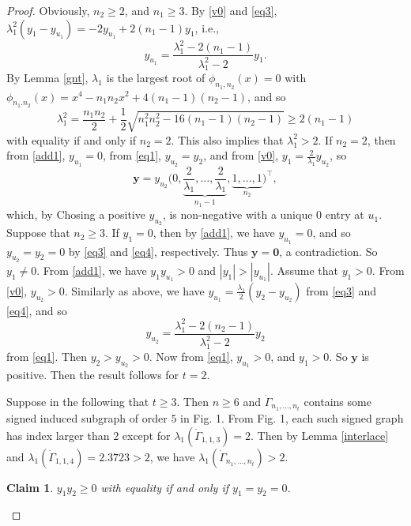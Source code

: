 \documentclass[10pt,a4paper]{amsart}
\numberwithin{equation}{section}
\newtheorem {Claim} {Claim}[section]
\begin{document}
\begin{proof}
Obviously, $n_2\ge 2$, and $n_1\ge 3$.  By \eqref{v0} and \eqref{eq3},  $\lambda_1^2(y_1-y_{u_1})=-2y_{u_1}+2(n_1-1)y_1$, i.e., 
\begin{equation}\label{add1}
y_{u_1}=\frac{\lambda_1^2-2(n_1-1)}{\lambda_1^2-2}y_1. 
\end{equation}
By Lemma \ref{gnt}, $\lambda_1$ is the largest root of $\phi_{n_1,n_2}(x)=0$ with $\phi_{n_1.n_2}(x)=x^4-n_1n_2x^2+4(n_1-1)(n_2-1)$, and so
\[
\lambda_1^2=\frac{n_1n_2}{2}+\frac{1}{2}\sqrt{n_1^2n_2^2-16(n_1-1)(n_2-1)}\ge 2(n_1-1)
\]
with equality if and only if $n_2=2$. This also implies that $\lambda_1^2>2$.  
If $n_2=2$, then from \eqref{add1}, 
 $y_{u_1}=0$,  from \eqref{eq1}, $y_{u_2}=y_2$, and from \eqref{v0},
 $y_1=\frac{2}{\lambda_1}y_{u_2}$, so 
 \[
\mathbf{y}=y_{u_2}\bigg(0,\underbrace{\frac{2}{\lambda_1},\dots,\frac{2}{\lambda_1}}_{n_1-1},\underbrace{1,\dots,1}_{n_2}\bigg)^\top,\]
which, by Chosing a positive $y_{u_2}$,   is non-negative with a unique $0$ entry at $u_1$. 
Suppose that $n_2\ge 3$. 
If $y_1=0$, then by \eqref{add1}, we have $y_{u_1}=0$, and so $y_{u_2}=y_2=0$ by \eqref{eq3} and \eqref{eq4}, respectively. Thus $\mathbf{y}=\mathbf{0}$, a contradiction. 
So $y_1\ne 0$. 
From \eqref{add1}, we have $y_1y_{u_1}>0$ and $|y_1|>|y_{u_1}|$. Assume that $y_1>0$. From \eqref{v0}, $y_{u_2}>0$. 
Similarly as above, we have $y_{u_1}=\frac{\lambda_1}{2}(y_2-y_{u_2})$ from 
\eqref{eq3} and \eqref{eq4},
and so 
\[
y_{u_2}=\frac{\lambda_1^2-2(n_2-1)}{\lambda_1^2-2}y_2
\]
from  \eqref{eq1}. Then $y_2>y_{u_2}>0$. Now from \eqref{eq1},  $y_{u_1}>0$, and $y_1>0$. 
So $\mathbf{y}$ is positive.  Then the result follows for $t=2$.



Suppose in the following  that $t\ge 3$. Then $n\ge 6$ and  $\dot\Gamma_{n_1, \dots, n_t}$ contains some signed induced subgraph of order $5$ in Fig. 1.  From Fig. 1, each such signed graph has index larger than $2$ except for $\lambda_1(\dot\Gamma_{1,1,3})=2$.
Then by Lemma \ref{interlace} and $\lambda_1(\dot\Gamma_{1,1,4})=2.3723> 2$, we have $\lambda_1(\dot\Gamma_{n_1, \dots, n_t})> 2$.

\begin{Claim} \label{Y1}
$y_1y_2\ge 0$ 
with equality if and only if $y_1=y_2=0$. 
\end{Claim}


\end{proof}
\end{document}

